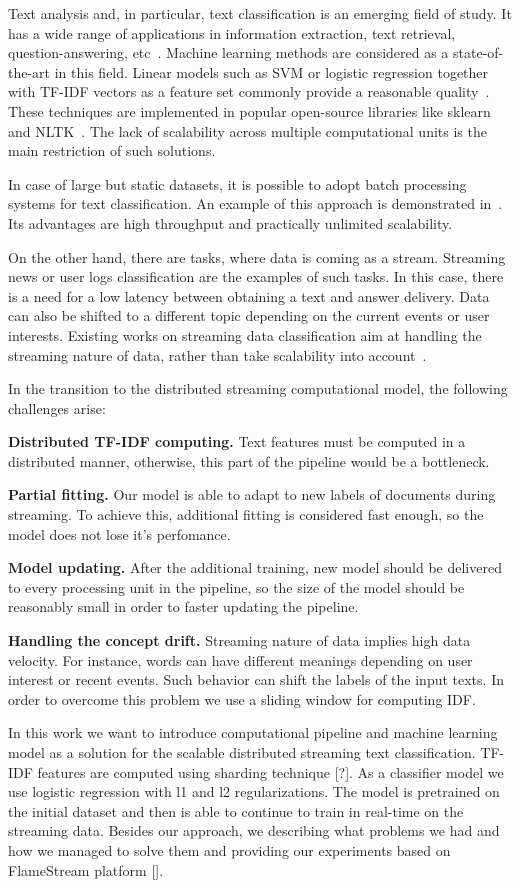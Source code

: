 \label {fs-short-intro}

Text analysis and, in particular, text classification is an emerging field of study. It has a wide range of applications in information extraction, text retrieval, question-answering, etc~\cite{tampakas2005}. Machine learning methods are considered as a state-of-the-art in this field. Linear models such as SVM or logistic regression together with TF-IDF vectors as a feature set commonly provide a reasonable quality~\cite{???}. These techniques are implemented in popular open-source libraries like sklearn~\cite{sklearn_api} and NLTK~\cite{bird2009natural}. The lack of scalability across multiple computational units is the main restriction of such solutions.

In case of large but static datasets, it is possible to adopt batch processing systems for text classification. An example of this approach is demonstrated in~\cite{semberecki2016distributed}. Its advantages are high throughput and practically unlimited scalability.

On the other hand, there are tasks, where data is coming as a stream. Streaming news or user logs classification are the examples of such tasks. In this case, there is a need for a low latency between obtaining a text and answer delivery. Data can also be shifted to a different topic depending on the current events or user interests. Existing works on streaming data classification aim at handling the streaming nature of data, rather than take scalability into account~\cite{zhang2008one}.

In the transition to the distributed streaming computational model, the following challenges arise:

\textbf{Distributed TF-IDF computing.} Text features must be computed in a distributed manner, otherwise, this part of the pipeline would be a bottleneck.

\textbf{Partial fitting.} Our model is able to adapt to new labels of documents during streaming. To achieve this, additional fitting is considered fast enough, so the model does not lose it's perfomance.

\textbf{Model updating.} After the additional training, new model should be delivered to every processing unit in the pipeline, so the size of the model should be reasonably small in order to faster updating the pipeline.

\textbf{Handling the concept drift.} Streaming nature of data implies high data velocity. For instance, words can have different meanings depending on user interest or recent events. Such behavior can shift the labels of the input texts. In order to overcome this problem we use a sliding window for computing IDF.

In this work we want to introduce computational pipeline and machine learning model as a solution for the scalable distributed streaming text classification. TF-IDF features are computed using sharding technique [?]. As a classifier model we use logistic regression with l1 and l2 regularizations. The model is pretrained on the initial dataset and then is able to continue to train in real-time on the streaming data. Besides our approach, we describing what problems we had and how we managed to solve them and providing our experiments based on FlameStream platform [].

